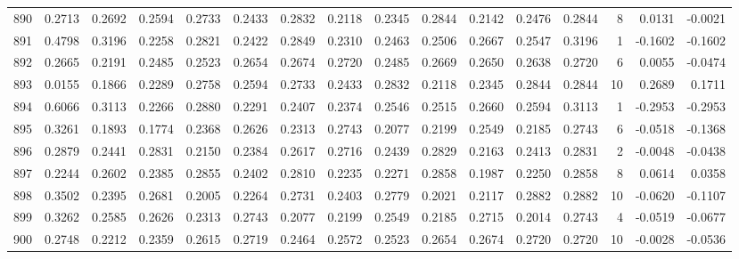 \begin{tabular}{lrrrrrrrrrrrrrrr}
890 &      0.2713 &  0.2692 &  0.2594 &  0.2733 &  0.2433 &  0.2832 &  0.2118 &  0.2345 &  0.2844 &  0.2142 &   0.2476 &     0.2844 &      8 &                    0.0131 &                    -0.0021 \\
891 &      0.4798 &  0.3196 &  0.2258 &  0.2821 &  0.2422 &  0.2849 &  0.2310 &  0.2463 &  0.2506 &  0.2667 &   0.2547 &     0.3196 &      1 &                   -0.1602 &                    -0.1602 \\
892 &      0.2665 &  0.2191 &  0.2485 &  0.2523 &  0.2654 &  0.2674 &  0.2720 &  0.2485 &  0.2669 &  0.2650 &   0.2638 &     0.2720 &      6 &                    0.0055 &                    -0.0474 \\
893 &      0.0155 &  0.1866 &  0.2289 &  0.2758 &  0.2594 &  0.2733 &  0.2433 &  0.2832 &  0.2118 &  0.2345 &   0.2844 &     0.2844 &     10 &                    0.2689 &                     0.1711 \\
894 &      0.6066 &  0.3113 &  0.2266 &  0.2880 &  0.2291 &  0.2407 &  0.2374 &  0.2546 &  0.2515 &  0.2660 &   0.2594 &     0.3113 &      1 &                   -0.2953 &                    -0.2953 \\
895 &      0.3261 &  0.1893 &  0.1774 &  0.2368 &  0.2626 &  0.2313 &  0.2743 &  0.2077 &  0.2199 &  0.2549 &   0.2185 &     0.2743 &      6 &                   -0.0518 &                    -0.1368 \\
896 &      0.2879 &  0.2441 &  0.2831 &  0.2150 &  0.2384 &  0.2617 &  0.2716 &  0.2439 &  0.2829 &  0.2163 &   0.2413 &     0.2831 &      2 &                   -0.0048 &                    -0.0438 \\
897 &      0.2244 &  0.2602 &  0.2385 &  0.2855 &  0.2402 &  0.2810 &  0.2235 &  0.2271 &  0.2858 &  0.1987 &   0.2250 &     0.2858 &      8 &                    0.0614 &                     0.0358 \\
898 &      0.3502 &  0.2395 &  0.2681 &  0.2005 &  0.2264 &  0.2731 &  0.2403 &  0.2779 &  0.2021 &  0.2117 &   0.2882 &     0.2882 &     10 &                   -0.0620 &                    -0.1107 \\
899 &      0.3262 &  0.2585 &  0.2626 &  0.2313 &  0.2743 &  0.2077 &  0.2199 &  0.2549 &  0.2185 &  0.2715 &   0.2014 &     0.2743 &      4 &                   -0.0519 &                    -0.0677 \\
900 &      0.2748 &  0.2212 &  0.2359 &  0.2615 &  0.2719 &  0.2464 &  0.2572 &  0.2523 &  0.2654 &  0.2674 &   0.2720 &     0.2720 &     10 &                   -0.0028 &                    -0.0536 \\

\end{tabular}
